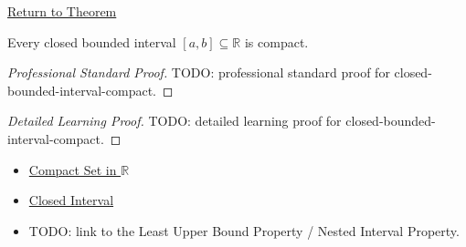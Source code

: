 \newpage
{}
\label{prf:closed-bounded-interval-compact}

\begin{remark*}[Return]
\hyperref[thm:closed-bounded-interval-compact]{Return to Theorem}
\end{remark*}

\begin{theorem*}
Every closed bounded interval $[a,b]\subseteq\mathbb{R}$ is compact.
\end{theorem*}

\begin{proof}[Professional Standard Proof]
\LRAProofBodyStart
TODO: professional standard proof for closed-bounded-interval-compact.
\end{proof}

\begin{proof}[Detailed Learning Proof]
\LRAProofBodyStart
TODO: detailed learning proof for closed-bounded-interval-compact.
\end{proof}

\begin{remark*}
\end{remark*}

\begin{dependencies}
\begin{itemize}
  \item \hyperref[def:compact-set]{Compact Set in $\mathbb{R}$}
  \item \hyperref[def:closed-interval]{Closed Interval}
  \item TODO: link to the Least Upper Bound Property / Nested Interval Property.
\end{itemize}
\end{dependencies}

\clearpage
